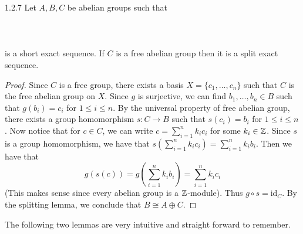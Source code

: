 \documentclass[a4paper]{article}
\begin{document}
\begin{prp}{}{1.2.7} Let $A,B,C$ be abelian groups such that \\~\\
\\~\\
is a short exact sequence. If $C$ is a free abelian group then it is a split exact sequence. \tcbline
\begin{proof}
Since $C$ is a free group, there exists a basis $X=\{c_1,\dots,c_n\}$ such that $C$ is the free abelian group on $X$. Since $g$ is surjective, we can find $b_1,\dots,b_n\in B$ such that $g(b_i)=c_i$ for $1\leq i\leq n$. By the universal property of free abelian group, there exists a group homomorphism $s:C\to B$ such that $s(c_i)=b_i$ for $1\leq i\leq n$. Now notice that for $c\in C$, we can write $c=\sum_{i=1}^nk_ic_i$ for some $k_i\in\mathbb{Z}$. Since $s$ is a group homomorphism, we have that $s\left(\sum_{i=1}^nk_ic_i\right)=\sum_{i=1}^nk_ib_i$. Then we have that $$g(s(c))=g\left(\sum_{i=1}^nk_ib_i\right)=\sum_{i=1}^nk_ic_i$$ (This makes sense since every abelian group is a $\mathbb{Z}$-module). Thus $g\circ s=\text{id}_C$. By the splitting lemma, we conclude that $B\cong A\oplus C$. 
\end{proof}
\end{prp}

The following two lemmas are very intuitive and straight forward to remember. 
\end{document}
